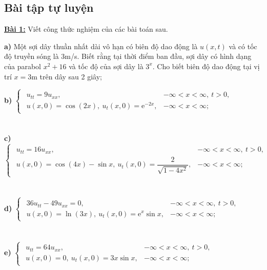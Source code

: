 \documentclass[10pt, a4paper]{article}
\begin{document}
	\subsection{Bài tập tự luyện}
	\textbf{\color{red}\underline{Bài 1:}} Viết công thức nghiệm của các bài toán sau.
	\begin{flushleft}
		\textbf{a) }Một sợi dây thuần nhất dài vô hạn có biên độ dao động là $u(x,t)$ và có tốc độ truyền sóng là 3m/s. Biết rằng tại thời điểm ban đầu, sợi dây có hình dạng của parabol $x^2+16$ và tốc độ của sợi dây là $3^x$. Cho biết biên độ dao động tại vị trí $x=3$m trên dây sau 2 giây;
	\end{flushleft}
	\textbf{b) }$\begin{cases}
		\begin{array}{ll}
			u_{tt}=9u_{xx}, & -\infty<x<\infty,~t>0,\\
			u(x,0)=\cos(2x),~u_t(x,0)=\mathrm e^{-2x}, & -\infty<x<\infty;
		\end{array}
	\end{cases}$\\\\\\
	\textbf{c) }$\begin{cases}
		\begin{array}{ll}
			u_{tt}=16u_{xx}, & -\infty<x<\infty,~t>0,\\
			u(x,0)=\cos(4x)-\sin x,~u_t(x,0)=\dfrac{2}{\sqrt{1-4x^2}}, & -\infty<x<\infty;
		\end{array}
	\end{cases}$\\\\\\
	\textbf{d) }$\begin{cases}
		\begin{array}{ll}
			36u_{tt}-49u_{xx}=0, & -\infty<x<\infty,~t>0,\\
			u(x,0)=\ln(3x),~u_t(x,0)=\mathrm e^{x}\sin x, & -\infty<x<\infty;
		\end{array}
	\end{cases}$\\\\\\
	\textbf{e) }$\begin{cases}
		\begin{array}{ll}
			u_{tt}=64u_{xx}, & -\infty<x<\infty,~t>0,\\
			u(x,0)=0,~u_t(x,0)=3x\sin x, & -\infty<x<\infty;
		\end{array}
	\end{cases}$\\\\\\
\end{document}

